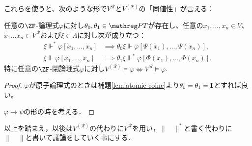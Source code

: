 \documentclass[realisability.tex]{subfiles}
\begin{document}
これらを使うと、次のような形で$V^{\mathcal{R}}$と$V^{(\mathcal{R})}$の「同値性」が言える：
\begin{theorem}
 任意の$\ZF$-論理式$\varphi$に対し$\theta_0, \theta_1 \in \PT$が存在し、任意の$x_1, \dots, x_n \in V$、$\dot{x}_1 \dots \dot{x}_n \in V^{\mathcal{R}}$および$\xi \in \Lambda$に対し次が成り立つ：
 \begin{align*}
  \xi \Vdash^* \varphi[\dot{x}_1, \dots, \dot{x}_n] &\implies \theta_0 \xi \Vdash \varphi[\Psi(\dot{x}_1), \dots, \Psi(\dot{x}_n)],\\
  \xi \Vdash \varphi[x_1, \dots, x_n] &\implies \theta_1 \xi \Vdash^* \varphi[\Phi(x_1), \dots, \Phi(x_n)].
 \end{align*}
 特に任意の$\ZF$-閉論理式$\varphi$に対し$V^{(\mathcal{R})} \models \varphi \iff V^{\mathcal{R}} \models \varphi$.
\end{theorem}
\begin{proof}
 $\varphi$が原子論理式のときは補題\ref{lem:atomic-coinc}より$\theta_0 = \theta_1 = \mathsf{\mathbf{I}}$とすれば良い。

 $\varphi \to \psi$の形の時を考える．
\end{proof}

以上を踏まえ，以後は$V^{(\mathcal{R})}$の代わりに$V^{\mathcal{R}}$を用い，$\|\quad\|^*$と書く代わりに$\|\quad\|$と書いて議論をしていく事にする．
\end{document}
